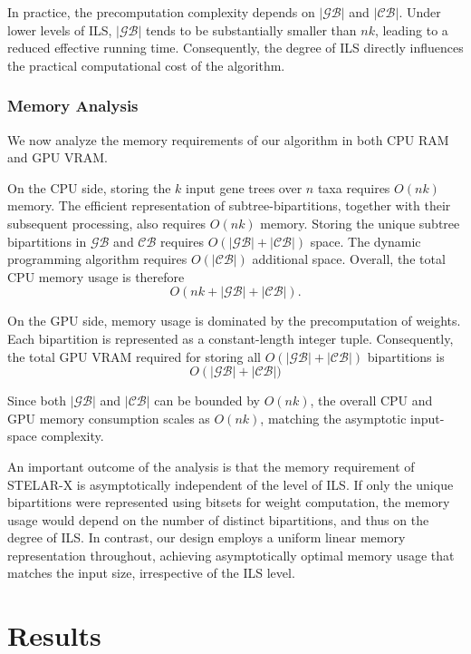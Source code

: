 \documentclass[10pt,a4paper]{article}
\begin{document}
In practice, the precomputation complexity depends on $|\mathcal{GB}|$ and $|\mathcal{CB}|$. Under lower levels of ILS, $|\mathcal{GB}|$ tends to be substantially smaller than $nk$, leading to a reduced effective running time. Consequently, the degree of ILS directly influences the practical computational cost of the algorithm.

\subsubsection{Memory Analysis} 

We now analyze the memory requirements of our algorithm in both CPU RAM and GPU VRAM.  

On the CPU side, storing the $k$ input gene trees over $n$ taxa requires $O(nk)$ memory. The efficient representation of subtree-bipartitions, together with their subsequent processing, also requires $O(nk)$ memory. Storing the unique subtree bipartitions in $\mathcal{GB}$ and $\mathcal{CB}$ requires $O(|\mathcal{GB}|+|\mathcal{CB}|)$ space. The dynamic programming algorithm requires $O(|\mathcal{CB}|)$ additional space. Overall, the total CPU memory usage is therefore
\[
O\!\left(nk + |\mathcal{GB}| + |\mathcal{CB}|\right).
\]

On the GPU side, memory usage is dominated by the precomputation of weights. Each bipartition is represented as a constant-length integer tuple. Consequently, the total GPU VRAM required for storing all $O(|\mathcal{GB}|+|\mathcal{CB}|)$ bipartitions is 
\[
O\!\left(|\mathcal{GB}|+|\mathcal{CB}|)\right.
\]

Since both $|\mathcal{GB}|$ and $|\mathcal{CB}|$ can be bounded by $O(nk)$, the overall CPU and GPU memory consumption scales as $O(nk)$, matching the asymptotic input-space complexity.

An important outcome of the analysis is that the memory requirement of \textsc{STELAR-X} is asymptotically independent of the level of ILS. If only the unique bipartitions were represented using bitsets for weight computation, the memory usage would depend on the number of distinct bipartitions, and thus on the degree of ILS. In contrast, our design employs a uniform linear memory representation throughout, achieving asymptotically optimal memory usage that matches the input size, irrespective of the ILS level.


\section{Results}
\end{document}
